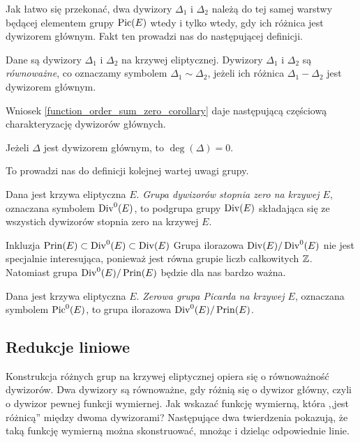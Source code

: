 \noindent
Jak łatwo się przekonać,
dwa dywizory $\Delta_1$ i $\Delta_2$ należą do tej samej warstwy
będącej elementem grupy $\operatorname{Pic}(E)$
wtedy i tylko wtedy, gdy ich różnica jest dywizorem głównym.
Fakt ten prowadzi nas do następującej definicji.

\begin{definition}
Dane są dywizory $\Delta_1$ i $\Delta_2$ na krzywej eliptycznej.
Dywizory $\Delta_1$ i $\Delta_2$ są \emph{równoważne},
co oznaczamy symbolem $\Delta_1 \sim \Delta_2$,
jeżeli ich różnica $\Delta_1 - \Delta_2$ jest dywizorem głównym.
\end{definition}

\noindent
Wniosek \ref{function_order_sum_zero_corollary}
daje następującą częściową charakteryzację dywizorów głównych.

\begin{fact}\label{prin_divi_zero_deg_fact}
Jeżeli $\Delta$ jest dywizorem głównym,
to $\deg(\Delta) = 0$.
\end{fact}

\noindent
To prowadzi nas do definicji kolejnej wartej uwagi grupy.

\begin{definition}
Dana jest krzywa eliptyczna $E$.
\emph{Grupa dywizorów stopnia zero na krzywej $E$},
oznaczana symbolem $\operatorname{Div}^0(E)$,
to podgrupa grupy $\operatorname{Div}(E)$
składająca się ze wszystich dywizorów stopnia zero na krzywej $E$.
\end{definition}

\noindent
Inkluzja $\operatorname{Prin}(E) \subset \operatorname{Div}^0(E) \subset \operatorname{Div}(E)$
Grupa ilorazowa $\operatorname{Div}(E) / \operatorname{Div}^0(E)$
nie jest specjalnie interesująca,
ponieważ jest równa grupie liczb całkowitych $\mathbb{Z}$.
Natomiast grupa $\operatorname{Div}^0(E) / \operatorname{Prin}(E)$
będzie dla nas bardzo ważna.

\begin{definition}
Dana jest krzywa eliptyczna $E$.
\emph{Zerowa grupa Picarda na krzywej $E$},
oznaczana symbolem $\operatorname{Pic}^0(E)$,
to grupa ilorazowa $\operatorname{Div}^0(E) / \operatorname{Prin}(E)$.
\end{definition}

\subsection*{Redukcje liniowe}

\noindent
Konstrukcja różnych grup na krzywej eliptycznej opiera się
o równoważność dywizorów. Dwa dywizory są równoważne,
gdy różnią się o dywizor główny, czyli o dywizor pewnej funkcji wymiernej.
Jak wskazać funkcję wymierną, która ,,jest różnicą'' między dwoma dywizorami?
Następujące dwa twierdzenia pokazują, że taką funkcję wymierną
można skonstruować, mnożąc i dzieląc odpowiednie linie.

